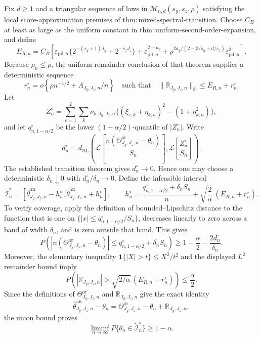 Fix \(d\ge 1\) and a triangular sequence of laws in \(\mathcal M_{n,d}(s_y,s_z,\rho)\) satisfying the local score-approximation premises of \(\mathrm{thm{:}mixed\text{-}spectral\text{-}transition}\).  Choose \(C_B\) at least as large as the uniform constant in \(\mathrm{thm{:}uniform\text{-}second\text{-}order\text{-}expansion}\), and define
\[
E_{R,n}=C_B\left[
\varepsilon_{\mathrm{pil},n}\{2^{-(s_y+1)J_y}+2^{-s_zJ_z}\}
+\varepsilon_{\mathrm{pil},n}^{2+a_y}
+\rho^{2a_y/(2+3/s_y+d/s_z)}\varepsilon_{\mathrm{pil},n}^2
\right].
\]
Because \(\rho_n\le\rho\), the uniform remainder conclusion of that theorem supplies a deterministic sequence
\[
r_n^\circ=o\!\left\{\rho n^{-1/2}+A_{J_y,J_z,n}/n\right\}
\quad\text{such that}\quad
\|\mathbb R_{J_y,J_z,n}\|_2\le E_{R,n}+r_n^\circ.
\]
Let
\[
Z_n^\circ=\sum_{e=1}^2\sum_k\nu_{k,J_y,J_z,n}
\{(\xi_{e,k}+\eta_{k,n})^2-(1+\eta_{k,n}^2)\},
\]
and let \(q_{n,1-\alpha/2}^\circ\) be the lower \((1-\alpha/2)\)-quantile of \(|Z_n^\circ|\).  Write
\[
d_n^\circ=d_{\mathrm{BL}}\!\left(
\mathcal L\!\left[\frac{n(\Theta^{\mathrm{or}}_{J_y,J_z,n}-\theta_n)}{S_n}\right],
\mathcal L\!\left[\frac{Z_n^\circ}{S_n}\right]
\right).
\]
The established transition theorem gives \(d_n^\circ\to0\).  Hence one may choose a deterministic \(\delta_n\downarrow0\) with \(d_n^\circ/\delta_n\to0\).  Define the infeasible interval
\[
\widetilde{\mathcal I}_n^\circ=
\left[\widehat\theta^{\mathrm{an}}_{J_y,J_z,n}-h_n^\circ,
\widehat\theta^{\mathrm{an}}_{J_y,J_z,n}+h_n^\circ\right],
\qquad
h_n^\circ=\frac{q_{n,1-\alpha/2}^\circ+\delta_nS_n}{n}
+\sqrt{\frac{2}{\alpha}}\,(E_{R,n}+r_n^\circ).
\]
To verify coverage, apply the definition of bounded--Lipschitz distance to the function that is one on
\(\{|x|\le q_{n,1-\alpha/2}^\circ/S_n\}\), decreases linearly to zero across a band of width \(\delta_n\), and is zero outside that band.  This gives
\[
P\!\left(
\left|n(\Theta^{\mathrm{or}}_{J_y,J_z,n}-\theta_n)\right|
\le q_{n,1-\alpha/2}^\circ+\delta_nS_n
\right)
\ge 1-\frac{\alpha}{2}-\frac{2d_n^\circ}{\delta_n}.
\]
Moreover, the elementary inequality
\(\mathbf 1\{|X|>t\}\le X^2/t^2\) and the displayed \(L^2\) remainder bound imply
\[
P\!\left(
|\mathbb R_{J_y,J_z,n}|>\sqrt{2/\alpha}\,(E_{R,n}+r_n^\circ)
\right)\le\frac{\alpha}{2}.
\]
Since the definitions of \(\Theta^{\mathrm{or}}_{J_y,J_z,n}\) and \(\mathbb R_{J_y,J_z,n}\) give the exact identity
\[
\widehat\theta^{\mathrm{an}}_{J_y,J_z,n}-\theta_n
=\Theta^{\mathrm{or}}_{J_y,J_z,n}-\theta_n
+\mathbb R_{J_y,J_z,n},
\]
the union bound proves
\[
\liminf_{n\to\infty}P\{\theta_n\in\widetilde{\mathcal I}_n^\circ\}\ge1-\alpha.
\]
